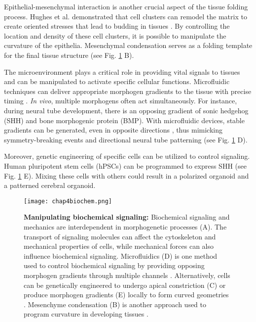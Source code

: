 Epithelial-mesenchymal interaction is another crucial aspect of the tissue folding process. Hughes et al. demonstrated that cell clusters can remodel the matrix to create oriented stresses that lead to budding in tissues \cite{hughes2018}. By controlling the location and density of these cell clusters, it is possible to manipulate the curvature of the epithelia. Mesenchymal condensation serves as a folding template for the final tissue structure \cite{palmquist2022, shyer2017} (see Fig. \ref{fig_4_3} B).

The microenvironment plays a critical role in providing vital signals to tissues and can be manipulated to activate specific cellular functions. Microfluidic techniques can deliver appropriate morphogen gradients to the tissue with precise timing \cite{hofer2021}. \textit{In vivo}, multiple morphogens often act simultaneously. For instance, during neural tube development, there is an opposing gradient of sonic hedgehog (SHH) and bone morphogenic protein (BMP). With microfluidic devices, stable gradients can be generated, even in opposite directions \cite{demers2016}, thus mimicking symmetry-breaking events and directional neural tube patterning (see Fig. \ref{fig_4_3} D).

Moreover, genetic engineering of specific cells can be utilized to control signaling. Human pluripotent stem cells (hPSCs) can be programmed to express SHH \cite{cederquist2019} (see Fig. \ref{fig_4_3} E). Mixing these cells with others could result in a polarized organoid and a patterned cerebral organoid.

\begin{figure}
	\centering
	\texttt{[image: chap4biochem.png]}
	\caption{\label{fig_4_3} \textbf{Manipulating biochemical signaling:} Biochemical signaling and mechanics are interdependent in morphogenetic processes (A). The transport of signaling molecules can affect the cytoskeleton and mechanical properties of cells, while mechanical forces can also influence biochemical signaling. Microfluidics (D) is one method used to control biochemical signaling by providing opposing morphogen gradients through multiple channels \cite{demers2016}. Alternatively, cells can be genetically engineered to undergo apical constriction (C) or produce morphogen gradients (E) locally to form curved geometries \cite{martinez-ara2022, cederquist2019}. Mesenchyme condensation (B) is another approach used to program curvature in developing tissues \cite{hughes2018, palmquist2022}.}
\end{figure}

